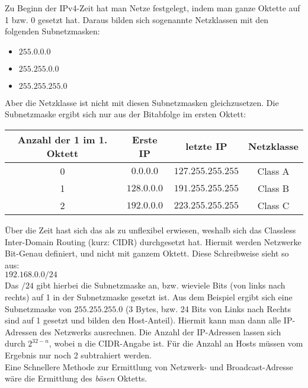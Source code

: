 \documentclass[a4paper, 12pt]{report}
\begin{document}
Zu Beginn der IPv4-Zeit hat man Netze festgelegt, indem man ganze Oktette auf 1 
bzw. 0 gesetzt hat. Daraus bilden sich sogenannte Netzklassen mit den folgenden 
Subnetzmasken: \\

\begin{itemize}
    \item $255.0.0.0$
    \item $255.255.0.0$
    \item $255.255.255.0$
\end{itemize}

Aber die Netzklasse ist nicht mit diesen Subnetzmasken gleichzusetzen. Die 
Subnetzmaske ergibt sich nur aus der Bitabfolge im ersten Oktett: 
\begin{center}
    \begin{tabular}{ | c | c | c | c | }
        \hline
        Anzahl der 1 im 1. Oktett & Erste IP & letzte IP & Netzklasse \\ \hline
        0 & $0.0.0.0$ & $127.255.255.255$ & Class A \\ \hline
        1 & $128.0.0.0$ & $191.255.255.255$ & Class B \\ \hline
        2 & $192.0.0.0$ & $223.255.255.255$ & Class C \\ \hline
    \end{tabular}
\end{center}

Über die Zeit hast sich das als zu unflexibel erwiesen, weshalb sich das 
Classless Inter-Domain Routing (kurz: CIDR) durchgesetzt hat. Hiermit werden 
Netzwerke Bit-Genau definiert, und nicht mit ganzem Oktett. Diese Schreibweise 
sieht so aus: \\

$192.168.0.0/24$ \\

Das $/24$ gibt hierbei die Subnetzmaske an, bzw. wieviele Bits (von links nach 
rechts) auf 1 in der Subnetzmaske gesetzt ist. Aus dem Beispiel ergibt sich eine 
Subnetzmaske von $255.255.255.0$ (3 Bytes, bzw. 24 Bits von Links nach Rechts 
sind auf 1 gesetzt und bilden den Host-Anteil). Hiermit kann man dann alle 
IP-Adressen des Netzwerks ausrechnen. Die Anzahl der IP-Adressen lassen sich 
durch $2^{32 - n}$, wobei n die CIDR-Angabe ist. Für die Anzahl an Hosts müssen
vom Ergebnis nur noch 2 subtrahiert werden. \\

Eine Schnellere Methode zur Ermittlung von Netzwerk- und Broadcast-Adresse wäre 
die Ermittlung des \emph{bösen} Oktetts. \\
\end{document}
